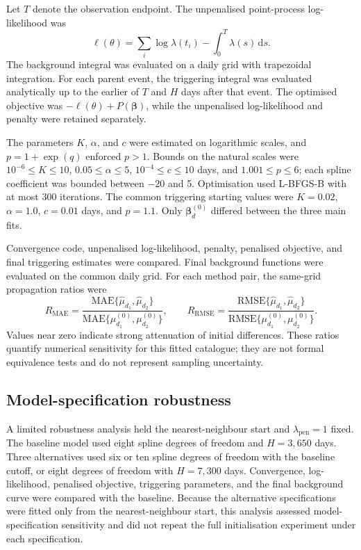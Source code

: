 Let $T$ denote the observation endpoint. The unpenalised point-process
log-likelihood was
\[
\ell(\theta)=
\sum_i\log\lambda(t_i)-
\int_0^T\lambda(s)\,\mathrm ds.
\]
The background integral was evaluated on a daily grid with trapezoidal
integration. For each parent event, the triggering integral was evaluated
analytically up to the earlier of $T$ and $H$ days after that event. The
optimised objective was $-\ell(\theta)+P(\boldsymbol\beta)$, while the
unpenalised log-likelihood and penalty were retained separately.

The parameters $K$, $\alpha$, and $c$ were estimated on logarithmic scales,
and $p=1+\exp(q)$ enforced $p>1$. Bounds on the natural scales were
$10^{-6}\leq K\leq10$, $0.05\leq\alpha\leq5$,
$10^{-4}\leq c\leq10$ days, and $1.001\leq p\leq6$; each spline coefficient
was bounded between $-20$ and 5. Optimisation used L-BFGS-B with at most 300
iterations. The common triggering starting values were $K=0.02$,
$\alpha=1.0$, $c=0.01$ days, and $p=1.1$. Only
$\boldsymbol\beta_d^{(0)}$ differed between the three main fits.

Convergence code, unpenalised log-likelihood, penalty, penalised objective,
and final triggering estimates were compared. Final background functions were
evaluated on the common daily grid. For each method pair, the same-grid
propagation ratios were
\[
R_{\mathrm{MAE}}=
\frac{\mathrm{MAE}\{\hat\mu_{d_1},\hat\mu_{d_2}\}}
{\mathrm{MAE}\{\mu^{(0)}_{d_1},\mu^{(0)}_{d_2}\}},
\qquad
R_{\mathrm{RMSE}}=
\frac{\mathrm{RMSE}\{\hat\mu_{d_1},\hat\mu_{d_2}\}}
{\mathrm{RMSE}\{\mu^{(0)}_{d_1},\mu^{(0)}_{d_2}\}}.
\]
Values near zero indicate strong attenuation of initial differences. These
ratios quantify numerical sensitivity for this fitted catalogue; they are not
formal equivalence tests and do not represent sampling uncertainty.

\subsection{Model-specification robustness}
\label{sec:robustness_method}

A limited robustness analysis held the nearest-neighbour start and
$\lambda_{\mathrm{pen}}=1$ fixed. The baseline model used eight spline degrees
of freedom and $H=3,650$ days. Three alternatives used six or ten spline
degrees of freedom with the baseline cutoff, or eight degrees of freedom with
$H=7,300$ days. Convergence, log-likelihood, penalised objective, triggering
parameters, and the final background curve were compared with the baseline.
Because the alternative specifications were fitted only from the
nearest-neighbour start, this analysis assessed model-specification
sensitivity and did not repeat the full initialisation experiment under each
specification.


